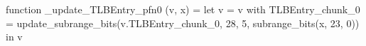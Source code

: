 function _update_TLBEntry_pfn0 (v, x) = let v = { v with TLBEntry_chunk_0 = update_subrange_bits(v.TLBEntry_chunk_0, 28, 5, subrange_bits(x, 23, 0)) } in
  v
